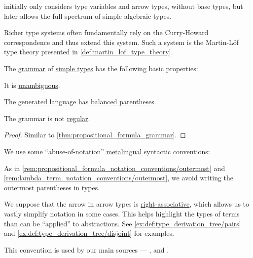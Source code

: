 \begin{concept}
\begin{thmenum}
     initially only considers type variables and arrow types, without base types, but later allows the full spectrum of simple algebraic types.

    Richer type systems often fundamentally rely on the Curry-Howard correspondence and thus extend this system. Such a system is the Martin-L\"of type theory presented in \cref{def:martin_lof_type_theory}.
  \end{thmenum}
\end{concept}

\begin{proposition}\label{thm:simple_type_grammar}
  The \hyperref[def:formal_grammar]{grammar} of \hyperref[def:simple_type]{simple types} has the following basic properties:
  \begin{thmenum}
     It is \hyperref[def:grammar_ambiguity]{unambiguous}.

     The \hyperref[def:formal_grammar/language]{generated language} has \hyperref[def:paired_delimiters]{balanced parentheses}.

     The grammar is not \hyperref[def:chomsky_hierarchy/regular]{regular}.
  \end{thmenum}
\end{proposition}
\begin{proof}
  Similar to \cref{thm:propositional_formula_grammar}.
\end{proof}

\begin{remark}\label{rem:simple_type_parentheses}
  We use some \enquote{abuse-of-notation} \hyperref[con:metalogic]{metalingual} syntactic conventions:
  \begin{thmenum}
     As in \cref{rem:propositional_formula_notation_conventions/outermost} and \cref{rem:lambda_term_notation_conventions/outermost}, we avoid writing the outermost parentheses in types.

     We suppose that the arrow in arrow types is \hyperref[rem:binary_operation_syntax_trees/associativity]{right-associative}, which allows us to vastly simplify notation in some cases. This helps highlight the types of terms than can be \enquote{applied} to abstractions. See \cref{ex:def:type_derivation_tree/pairs} and \cref{ex:def:type_derivation_tree/disjoint} for examples.

    This convention is used by our main sources --- ,  and .
  \end{thmenum}
\end{remark}

